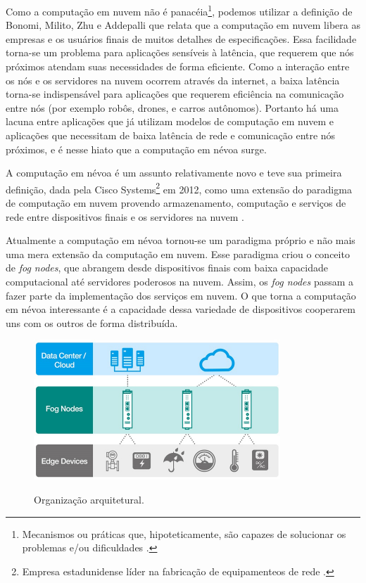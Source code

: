Como a computação em nuvem não é panacéia\footnote{Mecanismos ou práticas que, hipoteticamente, são capazes de solucionar os problemas e/ou dificuldades \cite{definition:panaceia}.}, podemos utilizar a definição de Bonomi, Milito, Zhu e Addepalli \cite{Bonomi:2012} que relata que a computação em nuvem libera as empresas e os usuários finais de muitos detalhes de especificações.
Essa facilidade torna-se um problema para aplicações sensíveis à latência, que requerem que nós próximos atendam suas necessidades de forma eficiente. 
Como a interação entre os nós e os servidores na nuvem ocorrem através da internet, a baixa latência torna-se indispensável para aplicações que requerem eficiência na comunicação entre nós (por exemplo robôs, drones, e carros autônomos).
Portanto há uma lacuna entre aplicações que já utilizam modelos de computação em nuvem e aplicações que necessitam de baixa latência de rede e comunicação entre nós próximos, e é nesse hiato que a computação em névoa surge.

A computação em névoa é um assunto relativamente novo e teve sua primeira definição, dada pela Cisco Systems\footnote{Empresa estadunidense líder na fabricação de equipamenteos de rede \cite{ciscoSystems}.} em 2012, como uma extensão do paradigma de computação em nuvem provendo armazenamento, computação e serviços de rede entre dispositivos finais e os servidores na nuvem \cite{DBLP:journals/corr/RomanLM16}. 

Atualmente a computação em névoa tornou-se um paradigma próprio e não mais uma mera extensão da computação em nuvem.
Esse paradigma criou o conceito de \textit{fog nodes}, que abrangem desde dispositivos finais com baixa capacidade computacional até servidores poderosos na nuvem.
Assim, os \textit{fog nodes} passam a fazer parte da implementação dos serviços em nuvem.
O que torna a computação em névoa interessante é a capacidade dessa variedade de dispositivos cooperarem uns com os outros de forma distribuída.

\begin{figure}[htb!]
    \centering\includegraphics[width=.5\textwidth]{fig1.pdf}
    \caption
    {\label{fig:fig1} Organização arquitetural.} \cite{archfog:2017}
\end{figure}

